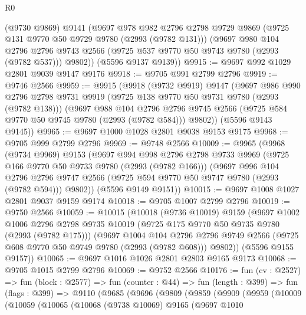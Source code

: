\begin{lexlean}{R0}
\begin{coremodule}
      (@9730 @9869)
      @9141
      (@9697
        @978
        @982
        @2796
        @2798
        @9729
        @9869
        (@9725 @131 @9770 @50 @9729 @9780 (@2993 (@9782 @131)))
        (@9697
          @980
          @104
          @2796
          @2796
          @9743
          @2566
          (@9725 @537 @9770 @50 @9743 @9780 (@2993 (@9782 @537)))
          @9802))
      (@5596 @9137 @9139))
@9915 := @9697 @992 @1029 @2801 @9039 @9147 @9176
@9918 := @9705 @991 @2799 @2796
@9919 := @9746 @2566
@9959 := @9915
    (@9918
      (@9732 @9919)
      @9147
      (@9697
        @986
        @990
        @2796
        @2798
        @9731
        @9919
        (@9725 @138 @9770 @50 @9731 @9780 (@2993 (@9782 @138)))
        (@9697
          @988
          @104
          @2796
          @2796
          @9745
          @2566
          (@9725 @584 @9770 @50 @9745 @9780 (@2993 (@9782 @584)))
          @9802))
      (@5596 @9143 @9145))
@9965 := @9697 @1000 @1028 @2801 @9038 @9153 @9175
@9968 := @9705 @999 @2799 @2796
@9969 := @9748 @2566
@10009 := @9965
    (@9968
      (@9734 @9969)
      @9153
      (@9697
        @994
        @998
        @2796
        @2798
        @9733
        @9969
        (@9725 @166 @9770 @50 @9733 @9780 (@2993 (@9782 @166)))
        (@9697
          @996
          @104
          @2796
          @2796
          @9747
          @2566
          (@9725 @594 @9770 @50 @9747 @9780 (@2993 (@9782 @594)))
          @9802))
      (@5596 @9149 @9151))
@10015 := @9697 @1008 @1027 @2801 @9037 @9159 @9174
@10018 := @9705 @1007 @2799 @2796
@10019 := @9750 @2566
@10059 := @10015
    (@10018
      (@9736 @10019)
      @9159
      (@9697
        @1002
        @1006
        @2796
        @2798
        @9735
        @10019
        (@9725 @175 @9770 @50 @9735 @9780 (@2993 (@9782 @175)))
        (@9697
          @1004
          @104
          @2796
          @2796
          @9749
          @2566
          (@9725 @608 @9770 @50 @9749 @9780 (@2993 (@9782 @608)))
          @9802))
      (@5596 @9155 @9157))
@10065 := @9697 @1016 @1026 @2801 @2803 @9165 @9173
@10068 := @9705 @1015 @2799 @2796
@10069 := @9752 @2566
@10176 := fun (cv : @2527) =>
  fun (block : @2577) =>
  fun (counter : @44) =>
  fun (length : @399) =>
  fun (flags : @399) =>
  @9110
    (@9685
      (@9696
        (@9809
          (@9859
            (@9909
              (@9959
                (@10009
                  (@10059
                    (@10065
                      (@10068
                        (@9738 @10069)
                        @9165
                        (@9697
                          @1010

\end{coremodule}
\end{lexlean}
